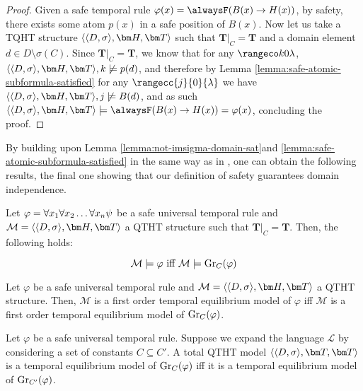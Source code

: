 \begin{proof}
  Given a safe temporal rule
  $\varphi(x) = \alwaysF(B(x) \rightarrow H(x))$, by safety, there
  exists some atom $p(x)$ in a safe position of $B(x)$. Now let us
  take a TQHT structure $\qthandt$ such that $\bm{T}\vert_{C}=\bm{T}$
  and a domain element $d \in D \setminus \sigma(C)$. Since
  $\bm{T}\vert_{C}=\bm{T}$, we know that for any $\kinlambda$,
  $\qthandt, k \not \models p(d)$, and therefore by Lemma
  \ref{lemma:safe-atomic-subformula-satisfied} for any
  $\rangecc{j}{0}{\lambda}$ we have $\qthandt,j \not \models B(d)$,
  and as such
  $\qthandt \models \alwaysF(B(x) \rightarrow H(x)) = \varphi(x)$,
  concluding the proof.
\end{proof}

By building upon Lemma \ref{lemma:not-imsigma-domain-sat}and
\ref{lemma:safe-atomic-subformula-satisfied} in the same way as in
\cite{agcapevidi17a}, one can obtain the following results, the final
one showing that our definition of safety guarantees domain independence.

\begin{proposition}
  Let $\varphi = \forall x_1 \forall x_2 \dots \forall x_n \psi$ be a safe universal temporal rule and \\
  $\mathcal{M} = \qthandt$ a QTHT structure such that
  $\bm{T}\vert_{C}=\bm{T}$. Then, the following holds:

  \begin{equation*}
    \mathcal{M} \models \varphi \text{ iff } \mathcal{M} \models \operatorname{Gr}_{C}(\varphi)
  \end{equation*}
\end{proposition}

\begin{proposition}
  Let $\varphi$ be a safe universal temporal rule and
  $\mathcal{M} = \qthandt$ a QTHT structure. Then, $\mathcal{M}$ is a
  first order temporal equilibrium model of $\varphi$ iff
  $\mathcal{M}$ is a first order temporal equilibrium model of
  $\operatorname{Gr}_{C}(\varphi)$.
\end{proposition}

\begin{theorem}\label{theorem:domain-independence}
  Let $\varphi$ be a safe universal temporal rule. Suppose we expand
  the language $\mathcal{L}$ by considering a set of constants
  $C \subseteq C'$. A total QTHT model $\qttandt$ is a temporal
  equilibrium model of $\operatorname{Gr}_{C}(\varphi)$ iff it is a temporal
  equilibrium model of $\operatorname{Gr}_{C'}(\varphi)$.
\end{theorem}

